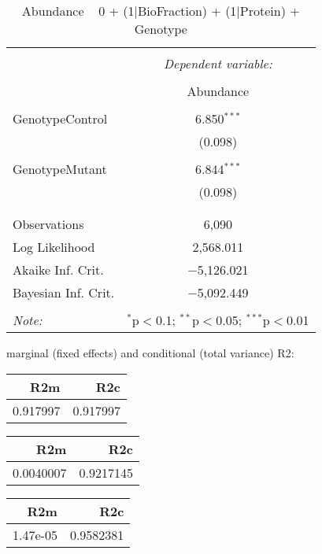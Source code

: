 \documentclass[11pt]{report}
\begin{document}
\begin{table}[!htbp] \centering 
  \caption{Abundance ~ 0 + (1|BioFraction) + (1|Protein) + Genotype} 
  \label{} 
\begin{tabular}{@{\extracolsep{5pt}}lc} 
\\[-1.8ex]\hline 
\hline \\[-1.8ex] 
 & \multicolumn{1}{c}{\textit{Dependent variable:}} \\ 
\cline{2-2} 
\\[-1.8ex] & Abundance \\ 
\hline \\[-1.8ex] 
 GenotypeControl & 6.850$^{***}$ \\ 
  & (0.098) \\ 
  & \\ 
 GenotypeMutant & 6.844$^{***}$ \\ 
  & (0.098) \\ 
  & \\ 
\hline \\[-1.8ex] 
Observations & 6,090 \\ 
Log Likelihood & 2,568.011 \\ 
Akaike Inf. Crit. & $-$5,126.021 \\ 
Bayesian Inf. Crit. & $-$5,092.449 \\ 
\hline 
\hline \\[-1.8ex] 
\textit{Note:}  & \multicolumn{1}{r}{$^{*}$p$<$0.1; $^{**}$p$<$0.05; $^{***}$p$<$0.01} \\ 
\end{tabular} 
\end{table} 
marginal (fixed effects) and conditional (total variance) R2:

\begin{tabular}{r|r}
\hline
R2m & R2c\\
\hline
0.917997 & 0.917997\\
\hline
\end{tabular}

\begin{tabular}{r|r}
\hline
R2m & R2c\\
\hline
0.0040007 & 0.9217145\\
\hline
\end{tabular}

\begin{tabular}{r|r}
\hline
R2m & R2c\\
\hline
1.47e-05 & 0.9582381\\
\hline
\end{tabular}
\end{document}
